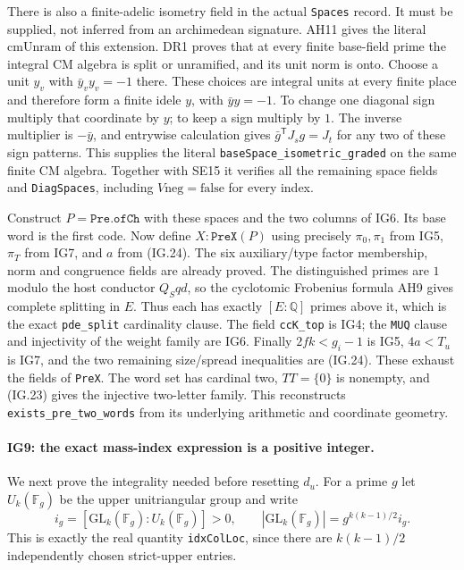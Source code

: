 There is also a finite-adelic isometry field in the actual
\texttt{Spaces} record. It must be supplied, not inferred from
an archimedean signature. AH11 gives the literal
$\mathrm{cmUnram}$ of this extension. DR1 proves that at every
finite base-field prime the integral CM algebra is split or
unramified, and its unit norm is onto. Choose a unit $y_v$
with $\bar y_vy_v=-1$ there. These choices are integral units
at every finite place and therefore form a finite idele $y$,
with $\bar yy=-1$. To change one diagonal sign multiply that
coordinate by $y$; to keep a sign multiply by $1$.
The inverse multiplier is $-\bar y$, and entrywise calculation
gives $\bar g^{\mathsf T}J_sg=J_t$ for any two of these sign
patterns. This supplies the literal
\texttt{baseSpace\_isometric\_graded} on the same finite CM
algebra. Together with SE15 it verifies all the remaining
space fields and \texttt{DiagSpaces}, including
$V\mathrm{neg}=\mathrm{false}$ for every index.

Construct $P=\texttt{Pre.ofCh}$ with these spaces and the two
columns of IG6. Its base word is the first code. Now define
$X:\texttt{PreX}(P)$ using precisely $\pi_0,\pi_1$ from IG5,
$\pi_T$ from IG7, and $a$ from (IG.24).
The six auxiliary/type factor membership, norm and congruence
fields are already proved. The distinguished primes are
$1$ modulo the host conductor $Q_Sqd$, so the cyclotomic
Frobenius formula AH9 gives complete splitting in $E$.
Thus each has exactly $[E:\mathbb Q]$ primes above it, which
is the exact \texttt{pde\_split} cardinality clause.
The field \texttt{ccK\_top} is IG4; the \texttt{MUQ} clause
and injectivity of the weight family are IG6.
Finally $2fk<g_i-1$ is IG5, $4a<T_u$ is IG7,
and the two remaining size/spread inequalities are (IG.24).
These exhaust the fields of \texttt{PreX}.
The word set has cardinal two, $TT=\{0\}$ is nonempty, and
(IG.23) gives the injective two-letter family. This reconstructs
\texttt{exists\_pre\_two\_words} from its underlying arithmetic
and coordinate geometry.

\paragraph{IG9: the exact mass-index expression is a positive integer.}
We next prove the integrality needed before resetting $d_u$.
For a prime $g$ let $U_k(\mathbb F_g)$ be the upper
unitriangular group and write
\[
 i_g=[\mathrm{GL}_k(\mathbb F_g):U_k(\mathbb F_g)]>0,
 \qquad |\mathrm{GL}_k(\mathbb F_g)|
                         =g^{k(k-1)/2}i_g.             \tag{IG.27}
\]
This is exactly the real quantity \texttt{idxColLoc}, since
there are $k(k-1)/2$ independently chosen strict-upper entries.

